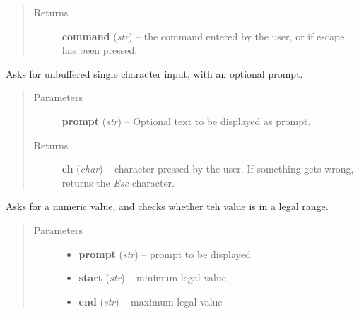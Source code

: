 \documentclass[letterpaper,10pt,english]{sphinxmanual}
\begin{document}
\begin{fulllineitems}
\begin{fulllineitems}
\begin{quote}
\begin{description}
\item[{Returns}] \leavevmode
\textbf{command} (\emph{str}) --
the command entered by the user, or  if escape has been pressed.

\end{description}\end{quote}

\end{fulllineitems}


\begin{fulllineitems}
\label{graf/graf:graf.Shell.get_ch}
Asks for unbuffered single character input, with an optional prompt.
\begin{quote}\begin{description}
\item[{Parameters}] \leavevmode
\textbf{prompt} (\emph{str}) --
Optional text to be displayed as prompt.

\item[{Returns}] \leavevmode
\textbf{ch} (\emph{char}) --
character pressed by the user.
If something gets wrong, returns the \emph{Esc} character.

\end{description}\end{quote}

\end{fulllineitems}


\begin{fulllineitems}
\label{graf/graf:graf.Shell.get_num}
Asks for a numeric value, and checks whether teh value is in a legal range.
\begin{quote}\begin{description}
\item[{Parameters}] \leavevmode\begin{itemize}
\item {} 
\textbf{prompt} (\emph{str}) --
prompt to be displayed

\item {} 
\textbf{start} (\emph{str}) --
minimum legal value

\item {} 
\textbf{end} (\emph{str}) --
maximum legal value

\end{itemize}


\end{description}
\end{quote}
\end{fulllineitems}
\end{fulllineitems}
\end{document}
